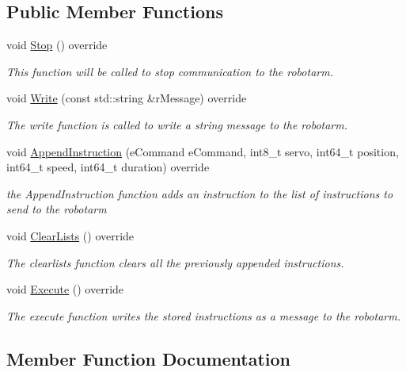 \subsection*{Public Member Functions}
\begin{DoxyCompactItemize}
\item 
void \hyperlink{classCCommandAL5D_a3cd260bd7bf8b4aa72dacc1d1ef2d38b}{Stop} () override
\begin{DoxyCompactList}\small\item\em This function will be called to stop communication to the robotarm. \end{DoxyCompactList}\item 
void \hyperlink{classCCommandAL5D_a308c945d4ed4009c85158a72e5db1bd5}{Write} (const std\+::string \&r\+Message) override
\begin{DoxyCompactList}\small\item\em The write function is called to write a string message to the robotarm. \end{DoxyCompactList}\item 
void \hyperlink{classCCommandAL5D_ae8b75aec364029b7cb65959325b6b9f7}{Append\+Instruction} (e\+Command e\+Command, int8\+\_\+t servo, int64\+\_\+t position, int64\+\_\+t speed, int64\+\_\+t duration) override
\begin{DoxyCompactList}\small\item\em the Append\+Instruction function adds an instruction to the list of instructions to send to the robotarm \end{DoxyCompactList}\item 
void \hyperlink{classCCommandAL5D_a46f133aa4b243af59e02f2cc23b12aa3}{Clear\+Lists} () override
\begin{DoxyCompactList}\small\item\em The clearlists function clears all the previously appended instructions. \end{DoxyCompactList}\item 
void \hyperlink{classCCommandAL5D_ac225e1c103a802a9276f201c94281ae2}{Execute} () override
\begin{DoxyCompactList}\small\item\em The execute function writes the stored instructions as a message to the robotarm. \end{DoxyCompactList}\end{DoxyCompactItemize}


\subsection{Member Function Documentation}
\mbox{\label{classCCommandAL5D_ae8b75aec364029b7cb65959325b6b9f7}} 
